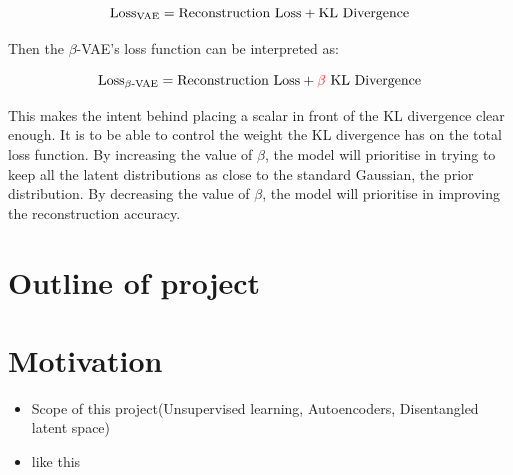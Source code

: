                 \[ \text{Loss\textsubscript{VAE}} = \text{Reconstruction Loss} + \text{KL Divergence} \]
                
                Then the $\beta$-VAE's loss function can be interpreted as:
                
                \[ \text{Loss\textsubscript{$\beta$-VAE}} = \text{Reconstruction Loss} + \textcolor{red}{\beta} \text{ KL Divergence} \]
                
                This makes the intent behind placing a scalar in front of the KL divergence clear enough. It is to be able to control the weight the KL divergence has on the total loss function. By increasing the value of $\beta$, the model will prioritise in trying to keep all the latent distributions as close to the standard Gaussian, the prior distribution. By decreasing the value of $\beta$, the model will prioritise in improving the reconstruction accuracy. 
                
    \section{Outline of project}
    
    \section{Motivation}
        \begin{itemize}
            \item Scope of this project(Unsupervised learning, Autoencoders, Disentangled latent space)
            \item like this
        \end{itemize}
        
